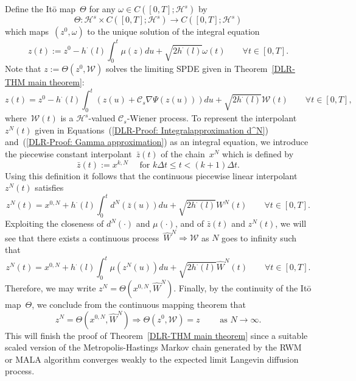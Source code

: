 Define the It\={o} map~$\Theta$ for any $\omega \in C([0,T];\mathcal{H}^s)$ by 
\begin{equation*}
 \Theta : \mathcal{H}^s \times C([0,T];\mathcal{H}^s) \to C([0,T];\mathcal{H}^s)
\end{equation*}
which maps~$(z^0, \omega)$ to the unique solution of the integral equation
\begin{equation}
  z(t) := z^0 - h^{\cdot}(l) \int_0^t \mu(z) du + \sqrt{2 h^{\cdot}(l)} \omega(t) \qquad \forall t \in [0,T].
\end{equation}
Note that $z := \Theta (z^0, \mathcal{W})$ solves the limiting SPDE given in Theorem~\ref{DLR-THM main theorem}:
\begin{equation}
 z(t) = z^0 -  h^{\cdot}(l) \int_0^t (z(u) + \mathcal{C}_s \nabla \Psi(z(u))) du + \sqrt{2 h^{\cdot}(l)} \mathcal{W}(t) \qquad \forall t \in [0,T],
\end{equation}
where~$\mathcal{W}(t)$ is a $ \mathcal{H}^s $-valued  $ \mathcal{C}_s $-Wiener process. To represent the interpolant~$z^N(t)$ given in Equations~(\ref{DLR-Proof: Integralapproximation d^N}) and~(\ref{DLR-Proof: Gamma approximation}) as an integral equation, we introduce the piecewise constant interpolant~$\bar{z}(t)$ of the chain~$x^N$ which is defined by
\begin{equation}
  \label{DLR: Proof Strategy Definition piecewise constant interpolant}
  \bar{z}(t) := x^{k,N} \quad \text{ for } k \Delta t \leq t < (k+1) \Delta t.
\end{equation}
Using this definition it follows that the continuous piecewise linear interpolant~$z^N(t)$ satisfies
\begin{equation}
  z^N(t) = x^{0,N} +  h^{\cdot}(l) \int_0^t d^N(\bar{z}(u)) du + \sqrt{2 h^{\cdot}(l)} W^N(t) \qquad \forall t \in [0,T].
\end{equation}
Exploiting the closeness of $d^N(\cdot)$ and $\mu(\cdot)$, and of $\bar{z}(t)$ and $z^N(t)$, we will see that there exists a continuous process~$\widehat{W}^N \Longrightarrow \mathcal{W}$ as $N$ goes to infinity such that
\begin{equation*}
 z^N(t) = x^{0,N} +  h^{\cdot}(l) \int_0^t \mu(z^N(u)) du + \sqrt{2 h^{\cdot}(l)} \widehat{W}^N(t) \qquad \forall t \in [0,T].
\end{equation*}
Therefore, we may write $z^N = \Theta (x^{0,N}, \widehat{W}^N)$. Finally, by the continuity of the It\={o} map~$\Theta$, we conclude from the continuous mapping theorem that
\begin{equation*}
  z^N = \Theta (x^{0,N}, \widehat{W}^N) \Longrightarrow \Theta (z^0, \mathcal{W}) = z \qquad \text{  as } N \to \infty.
\end{equation*}
This will finish the proof of Theorem~\ref{DLR-THM main theorem} since a suitable scaled version of the Metropolis-Hastings Markov chain generated by the RWM or MALA algorithm converges weakly to the expected limit Langevin diffusion process.



